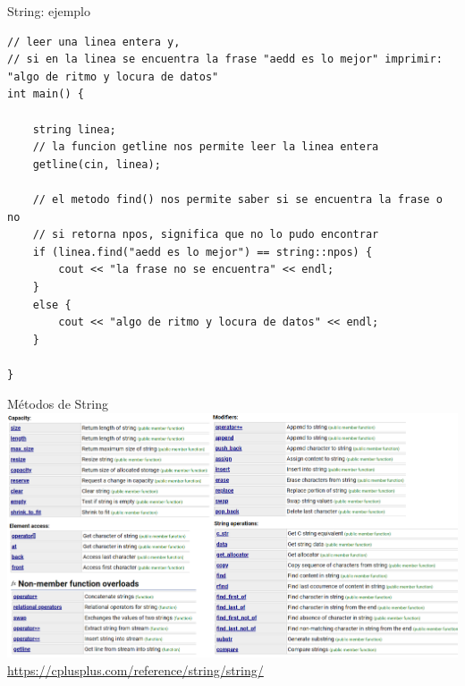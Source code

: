 \documentclass[12pt]{beamer}
\begin{document}
\begin{frame}[fragile]{String: ejemplo}
\begin{lstlisting}[basicstyle=\scriptsize]
// leer una linea entera y, 
// si en la linea se encuentra la frase "aedd es lo mejor" imprimir: "algo de ritmo y locura de datos"
int main() {

    string linea;
    // la funcion getline nos permite leer la linea entera
    getline(cin, linea);

    // el metodo find() nos permite saber si se encuentra la frase o no
    // si retorna npos, significa que no lo pudo encontrar
    if (linea.find("aedd es lo mejor") == string::npos) {
        cout << "la frase no se encuentra" << endl;
    }
    else {
        cout << "algo de ritmo y locura de datos" << endl;
    }

}
\end{lstlisting}
\end{frame}

\begin{frame}{Métodos de String}
    \centering\includegraphics[width=\textwidth]{metodos.png}
    \centering\url{https://cplusplus.com/reference/string/string/}
\end{frame}
\end{document}
